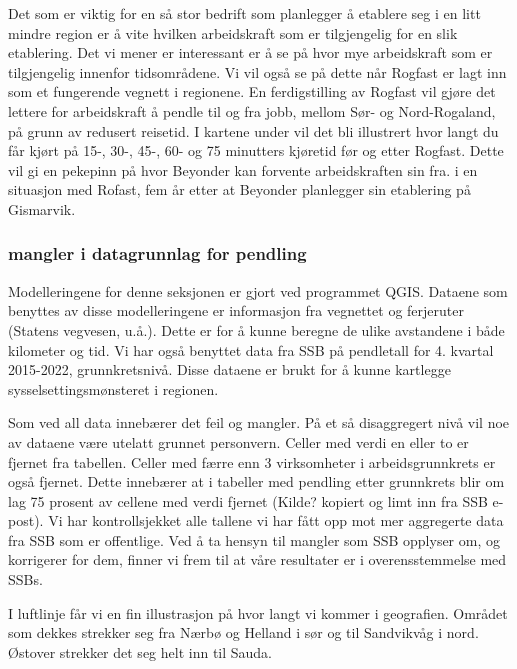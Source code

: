 \documentclass[
]{article}
\begin{document}
Det som er viktig for en så stor bedrift som planlegger å etablere seg i
en litt mindre region er å vite hvilken arbeidskraft som er tilgjengelig
for en slik etablering. Det vi mener er interessant er å se på hvor mye
arbeidskraft som er tilgjengelig innenfor tidsområdene. Vi vil også se
på dette når Rogfast er lagt inn som et fungerende vegnett i regionene.
En ferdigstilling av Rogfast vil gjøre det lettere for arbeidskraft å
pendle til og fra jobb, mellom Sør- og Nord-Rogaland, på grunn av
redusert reisetid. I kartene under vil det bli illustrert hvor langt du
får kjørt på 15-, 30-, 45-, 60- og 75 minutters kjøretid før og etter
Rogfast. Dette vil gi en pekepinn på hvor Beyonder kan forvente
arbeidskraften sin fra. i en situasjon med Rofast, fem år etter at
Beyonder planlegger sin etablering på Gismarvik.

\hypertarget{mangler-i-datagrunnlag-for-pendling}{%
\subsubsection{mangler i datagrunnlag for
pendling}\label{mangler-i-datagrunnlag-for-pendling}}

Modelleringene for denne seksjonen er gjort ved programmet QGIS. Dataene
som benyttes av disse modelleringene er informasjon fra vegnettet og
ferjeruter (Statens vegvesen, u.å.). Dette er for å kunne beregne de
ulike avstandene i både kilometer og tid. Vi har også benyttet data fra
SSB på pendletall for 4. kvartal 2015-2022, grunnkretsnivå. Disse
dataene er brukt for å kunne kartlegge sysselsettingsmønsteret i
regionen.

Som ved all data innebærer det feil og mangler. På et så disaggregert
nivå vil noe av dataene være utelatt grunnet personvern. Celler med
verdi en eller to er fjernet fra tabellen. Celler med færre enn 3
virksomheter i arbeidsgrunnkrets er også fjernet. Dette innebærer at i
tabeller med pendling etter grunnkrets blir om lag 75 prosent av cellene
med verdi fjernet (Kilde? kopiert og limt inn fra SSB e-post). Vi har
kontrollsjekket alle tallene vi har fått opp mot mer aggregerte data fra
SSB som er offentlige. Ved å ta hensyn til mangler som SSB opplyser om,
og korrigerer for dem, finner vi frem til at våre resultater er i
overensstemmelse med SSBs.

I luftlinje får vi en fin illustrasjon på hvor langt vi kommer i
geografien. Området som dekkes strekker seg fra Nærbø og Helland i sør
og til Sandvikvåg i nord. Østover strekker det seg helt inn til Sauda.
\end{document}
